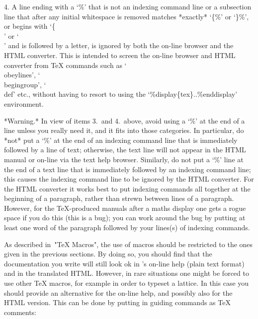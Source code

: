 \item{4.}
A line ending with a `\%' that is not  an  indexing  command  line  or  a
subsection line that after any  initial  whitespace  is  removed  matches
*exactly* `\{\%' or `\}\%', or begins with `\{\\' or `\\' and is followed
by a letter, is  ignored  by  both  the  on-line  browser  and  the  HTML
converter. This is intended  to  screen  the  on-line  browser  and  HTML
converter from {\TeX} commands  such  as  `\\obeylines',  `\\begingroup',
`\\def'   etc.,   without    having    to    resort    to    using    the
`\%display\{tex\}..\%enddisplay' environment.

\endlist

*Warning.* In view of items 3.~and 4.~above, avoid using a  `\%'  at  the
end of a line  unless  you  really  need  it,  and  it  fits  into  those
categories. In particular, do *not* put a `\%' at the end of an  indexing
command line that is immediately followed by a line of  text;  otherwise,
the text line will not appear in the HTML manual or on-line via the  text
help browser. Similarly, do not put a `\%' line at the end of a text line
that is immediately followed by an indexing command line; this causes the
indexing command line to be ignored by the HTML converter. For  the  HTML
converter it works best to put indexing  commands  all  together  at  the
beginning  of  a  paragraph,  rather  than  strewn  between  lines  of  a
paragraph. However, for the {\TeX}-produced manuals after a maths display
one gets a rogue space if you do this (this  is  a  bug);  you  can  work
around the bug by putting at least one word of the paragraph followed  by
your lines(s) of indexing commands.


As described in~"TeX Macros", the use of macros should be  restricted  to
the ones given in the previous sections. By doing  so,  you  should  find
that the documentation you write will still look ok in  {\GAP}'s  on-line
help (plain text format) and in the translated  HTML.  However,  in  rare
situations one might be forced to use other {\TeX} macros, for example in
order  to  typeset  a  lattice.  In  this  case  you  should  provide  an
alternative for the on-line help, and possibly also for the HTML version.
This can be done by putting in guiding commands as {\TeX} comments:

